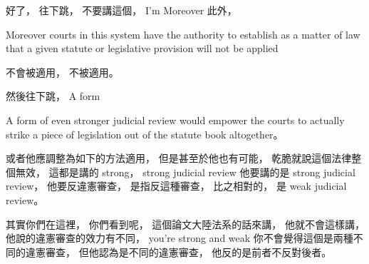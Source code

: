\hypertarget{w06:cue:630}{}好了，
\hypertarget{w06:cue:631}{}往下跳，
\hypertarget{w06:cue:632}{}不要講這個，
\hypertarget{w06:cue:633}{}I'm Moreover
\hypertarget{w06:cue:634}{}此外，

\hypertarget{w06:cue:635}{}Moreover courts in this system
\hypertarget{w06:cue:636}{}have the authority to establish as a matter of law
\hypertarget{w06:cue:637}{}that a given statute or legislative provision
\hypertarget{w06:cue:638}{}will not be applied

\hypertarget{w06:cue:639}{}不會被適用，
\hypertarget{w06:cue:640}{}不被適用。

\hypertarget{w06:cue:641}{}然後往下跳，
\hypertarget{w06:cue:642}{}A form

\hypertarget{w06:cue:643}{}A form of even stronger judicial review
\hypertarget{w06:cue:644}{}would empower the courts
\hypertarget{w06:cue:645}{}to actually strike a piece of legislation
\hypertarget{w06:cue:646}{}out of the statute book altogether。

\hypertarget{w06:cue:647}{}或者他應調整為如下的方法適用，
\hypertarget{w06:cue:648}{}但是甚至於他也有可能，
\hypertarget{w06:cue:649}{}乾脆就說這個法律整個無效，
\hypertarget{w06:cue:650}{}這都是講的 strong，
\hypertarget{w06:cue:651}{}strong judicial review
\hypertarget{w06:cue:652}{}他要講的是 strong judicial review，
\hypertarget{w06:cue:653}{}他要反違憲審查，
\hypertarget{w06:cue:654}{}是指反這種審查，
\hypertarget{w06:cue:655}{}比之相對的，
\hypertarget{w06:cue:656}{}是 weak judicial review。

\hypertarget{w06:cue:657}{}其實你們在這裡，
\hypertarget{w06:cue:658}{}你們看到呢，
\hypertarget{w06:cue:659}{}這個論文大陸法系的話來講，
\hypertarget{w06:cue:660}{}他就不會這樣講，
\hypertarget{w06:cue:661}{}他說的違憲審查的效力有不同，
\hypertarget{w06:cue:662}{}you're strong and weak
\hypertarget{w06:cue:663}{}你不會覺得這個是兩種不同的違憲審查，
\hypertarget{w06:cue:664}{}但他認為是不同的違憲審查，
\hypertarget{w06:cue:665}{}他反的是前者不反對後者。

